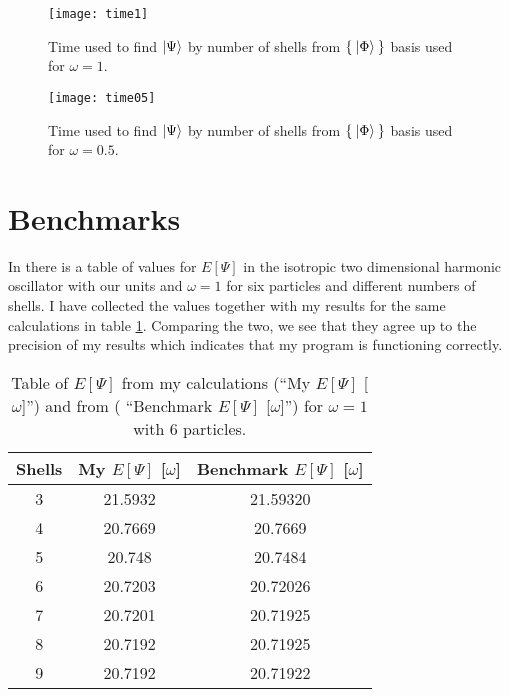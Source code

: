 \documentclass[a4paper,english,12pt]{article}
\begin{document}
\begin{figure}
  \begin{center}
    \texttt{[image: time1]}
  \end{center}
  \caption{Time used to find $\Ket{\Psi}$ by number of shells from \(\Set{\Ket{\Phi}}\) basis used for $\omega=1$.}\label{figtime1}
\end{figure}


\begin{figure}
  \begin{center}
    \texttt{[image: time05]}
  \end{center}
  \caption{Time used to find $\Ket{\Psi}$ by number of shells from \(\Set{\Ket{\Phi}}\) basis used for $\omega=0.5$.}\label{figtime05}
\end{figure}


\section{Benchmarks}


In \cite{mortenslides} there is a table of values for $E[\Psi]$ in the isotropic two dimensional harmonic oscillator with our units and $\omega = 1$
for six particles and different numbers of shells. I have collected the values together with my results for the same calculations in table \ref{tabbench}.
Comparing the two, we see that they agree up to the precision of my results which indicates that my program is functioning correctly.


\begin{table}
  \caption{Table of $E[\Psi]$ from my calculations (``My $E[\Psi]$ [$\omega$]'') and from \cite{mortenslides} ( ``Benchmark $E[\Psi]$ [$\omega$]'') for $\omega = 1$ with 6 particles.}\label{tabbench}
  \begin{center}
    \begin{tabular}{*{3}{c}}
      Shells &  My $E[\Psi]$ [$\omega$] & Benchmark $E[\Psi]$ [$\omega$]   \\
      \hline
      3&21.5932&21.59320\\
      4&20.7669&20.7669\\
      5&20.748&20.7484\\
      6&20.7203&20.72026\\
      7&20.7201&20.71925\\
      8&20.7192&20.71925\\
      9&20.7192&20.71922
    \end{tabular}
  \end{center}
\end{table}
\end{document}
